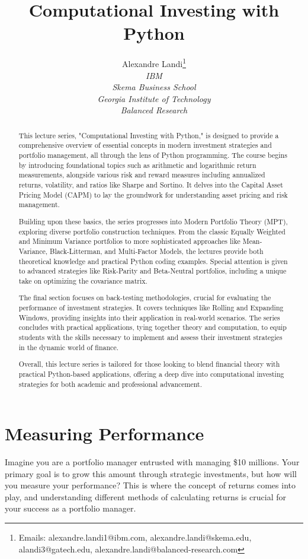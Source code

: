 \documentclass{article}
\title{Computational Investing with Python}
\author{Alexandre Landi\thanks{Emails: alexandre.landi1@ibm.com,
alexandre.landi@skema.edu,
alandi3@gatech.edu,
alexandre.landi@balanced-research.com} \\
    \textit{IBM} \\
    \textit{Skema Business School} \\
    \textit{Georgia Institute of Technology} \\
    \textit{Balanced Research} }
\begin{document}
\maketitle

\begin{abstract}
This lecture series, "Computational Investing with Python," is designed to provide a comprehensive overview of essential concepts in modern investment strategies and portfolio management, all through the lens of Python programming. The course begins by introducing foundational topics such as arithmetic and logarithmic return measurements, alongside various risk and reward measures including annualized returns, volatility, and ratios like Sharpe and Sortino. It delves into the Capital Asset Pricing Model (CAPM) to lay the groundwork for understanding asset pricing and risk management.

Building upon these basics, the series progresses into Modern Portfolio Theory (MPT), exploring diverse portfolio construction techniques. From the classic Equally Weighted and Minimum Variance portfolios to more sophisticated approaches like Mean-Variance, Black-Litterman, and Multi-Factor Models, the lectures provide both theoretical knowledge and practical Python coding examples. Special attention is given to advanced strategies like Risk-Parity and Beta-Neutral portfolios, including a unique take on optimizing the covariance matrix.

The final section focuses on back-testing methodologies, crucial for evaluating the performance of investment strategies. It covers techniques like Rolling and Expanding Windows, providing insights into their application in real-world scenarios. The series concludes with practical applications, tying together theory and computation, to equip students with the skills necessary to implement and assess their investment strategies in the dynamic world of finance.

Overall, this lecture series is tailored for those looking to blend financial theory with practical Python-based applications, offering a deep dive into computational investing strategies for both academic and professional advancement.
\end{abstract}

\section{Measuring Performance}

Imagine you are a portfolio manager entrusted with managing \$10 millions. Your primary goal is to grow this amount through strategic investments, but how will you measure your performance? This is where the concept of returns comes into play, and understanding different methods of calculating returns is crucial for your success as a portfolio manager.
\end{document}
